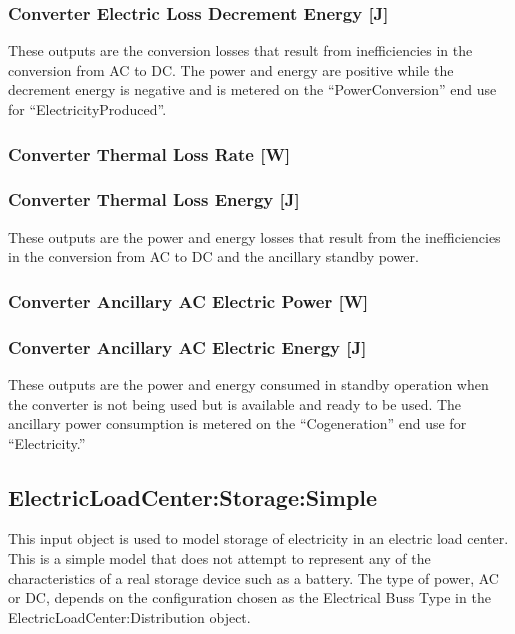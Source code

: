 \subsubsection{Converter Electric Loss Decrement Energy {[}J{]}}\label{converter-electric-loss-decrement-energy-j}

These outputs are the conversion losses that result from inefficiencies in the conversion from AC to DC. The power and energy are positive while the decrement energy is negative and is metered on the ``PowerConversion'' end use for ``ElectricityProduced''.

\subsubsection{Converter Thermal Loss Rate {[}W{]}}\label{converter-thermal-loss-rate-w}

\subsubsection{Converter Thermal Loss Energy {[}J{]}}\label{converter-thermal-loss-energy-j}

These outputs are the power and energy losses that result from the inefficiencies in the conversion from AC to DC and the ancillary standby power.

\subsubsection{Converter Ancillary AC Electric Power {[}W{]}}\label{converter-ancillary-ac-electric-power-w}

\subsubsection{Converter Ancillary AC Electric Energy {[}J{]}}\label{converter-ancillary-ac-electric-energy-j}

These outputs are the power and energy consumed in standby operation when the converter is not being used but is available and ready to be used. The ancillary power consumption is metered on the ``Cogeneration'' end use for ``Electricity.''

\subsection{ElectricLoadCenter:Storage:Simple}\label{electricloadcenterstoragesimple}

This input object is used to model storage of electricity in an electric load center. This is a simple model that does not attempt to represent any of the characteristics of a real storage device such as a battery. The type of power, AC or DC, depends on the configuration chosen as the Electrical Buss Type in the ElectricLoadCenter:Distribution object.


